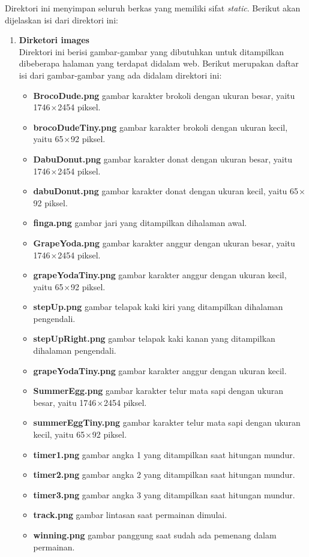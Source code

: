 \begin{enumerate}
	Direktori ini menyimpan seluruh berkas yang memiliki sifat \textit{static}. Berikut akan dijelaskan isi dari direktori ini:
	\begin{enumerate}
		\item \textbf{Dirketori images} \\
		Direktori ini berisi gambar-gambar yang dibutuhkan untuk ditampilkan dibeberapa halaman yang terdapat didalam web. Berikut merupakan daftar isi dari gambar-gambar yang ada didalam direktori ini: 
		\begin{itemize}
			\item \textbf{BrocoDude.png} gambar karakter brokoli dengan ukuran besar, yaitu 1746 × 2454 piksel.
			\item \textbf{brocoDudeTiny.png} gambar karakter brokoli dengan ukuran kecil, yaitu 65 × 92 piksel.
			\item \textbf{DabuDonut.png} gambar karakter donat dengan ukuran besar, yaitu 1746 × 2454 piksel.
			\item \textbf{dabuDonut.png} gambar karakter donat dengan ukuran kecil, yaitu 65 × 92 piksel.
			\item \textbf{finga.png} gambar jari yang ditampilkan dihalaman awal.
			\item \textbf{GrapeYoda.png} gambar karakter anggur dengan ukuran besar, yaitu 1746 × 2454 piksel.
			\item \textbf{grapeYodaTiny.png} gambar karakter anggur dengan ukuran kecil, yaitu 65 × 92 piksel.
			\item \textbf{stepUp.png} gambar telapak kaki kiri yang ditampilkan dihalaman pengendali.
			\item \textbf{stepUpRight.png} gambar telapak kaki kanan yang ditampilkan dihalaman pengendali.
			\item \textbf{grapeYodaTiny.png} gambar karakter anggur dengan ukuran kecil.
			\item \textbf{SummerEgg.png} gambar karakter telur mata sapi dengan ukuran besar, yaitu 1746 × 2454 piksel.
			\item \textbf{summerEggTiny.png} gambar karakter telur mata sapi dengan ukuran kecil, yaitu 65 × 92 piksel.
			\item \textbf{timer1.png} gambar angka 1 yang ditampilkan saat hitungan mundur.
			\item \textbf{timer2.png} gambar angka 2 yang ditampilkan saat hitungan mundur.
			\item \textbf{timer3.png} gambar angka 3 yang ditampilkan saat hitungan mundur.
			\item \textbf{track.png} gambar lintasan saat permainan dimulai.
			\item \textbf{winning.png} gambar panggung saat sudah ada pemenang dalam permainan.
		\end{itemize}
	

\end{enumerate}
\end{enumerate}
